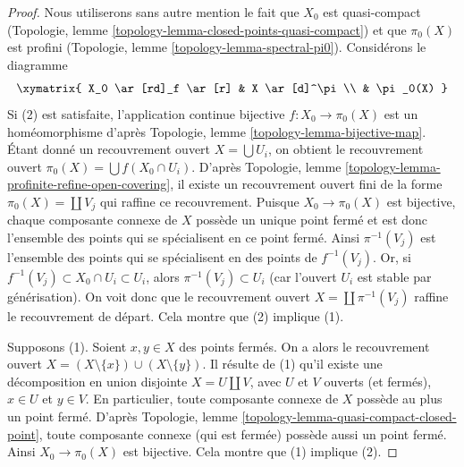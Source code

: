 \begin{proof}
Nous utiliserons sans autre mention le fait que
$X_0$ est quasi-compact
(Topologie, lemme \ref{topology-lemma-closed-points-quasi-compact})
et que $\pi_0(X)$ est profini
(Topologie, lemme \ref{topology-lemma-spectral-pi0}).
Consid\'erons le diagramme
$$
\xymatrix{
X_0 \ar[rd]_f \ar[r] & X \ar[d]^\pi \\
& \pi_0(X)
}
$$
Si (2) est satisfaite, l'application continue bijective $f : X_0 \to \pi_0(X)$ est
un hom\'eomorphisme d'apr\`es
Topologie, lemme \ref{topology-lemma-bijective-map}.
\'Etant donn\'e un recouvrement ouvert $X = \bigcup U_i$, on obtient le recouvrement ouvert
$\pi_0(X) = \bigcup f(X_0 \cap U_i)$. D'apr\`es
Topologie, lemme \ref{topology-lemma-profinite-refine-open-covering},
il existe un recouvrement ouvert fini de la forme $\pi_0(X) = \coprod V_j$
qui raffine ce recouvrement.
Puisque $X_0 \to \pi_0(X)$ est bijective, chaque composante connexe de
$X$ poss\`ede un unique point ferm\'e et est donc l'ensemble des points qui se
sp\'ecialisent en ce point ferm\'e. Ainsi $\pi^{-1}(V_j)$ est
l'ensemble des points qui se sp\'ecialisent en des points de $f^{-1}(V_j)$.
Or, si $f^{-1}(V_j) \subset X_0 \cap U_i \subset U_i$, alors
$\pi^{-1}(V_j) \subset U_i$ (car l'ouvert
$U_i$ est stable par g\'en\'erisation). On voit donc
que le recouvrement ouvert $X = \coprod \pi^{-1}(V_j)$ raffine
le recouvrement de d\'epart. Cela montre que
(2) implique (1).

\medskip\noindent
Supposons (1). Soient $x, y \in X$ des points ferm\'es. On a alors le recouvrement ouvert
$X = (X \setminus \{x\}) \cup (X \setminus \{y\})$.
Il r\'esulte de (1) qu'il existe une d\'ecomposition en union disjointe
$X = U \amalg V$, avec $U$ et $V$ ouverts (et ferm\'es), $x \in U$ et
$y \in V$. En particulier, toute composante connexe de $X$
poss\`ede au plus un point ferm\'e. D'apr\`es
Topologie, lemme \ref{topology-lemma-quasi-compact-closed-point},
toute composante connexe (qui est ferm\'ee) poss\`ede aussi un point ferm\'e.
Ainsi $X_0 \to \pi_0(X)$ est bijective. Cela montre que (1) implique (2).


\end{proof}
